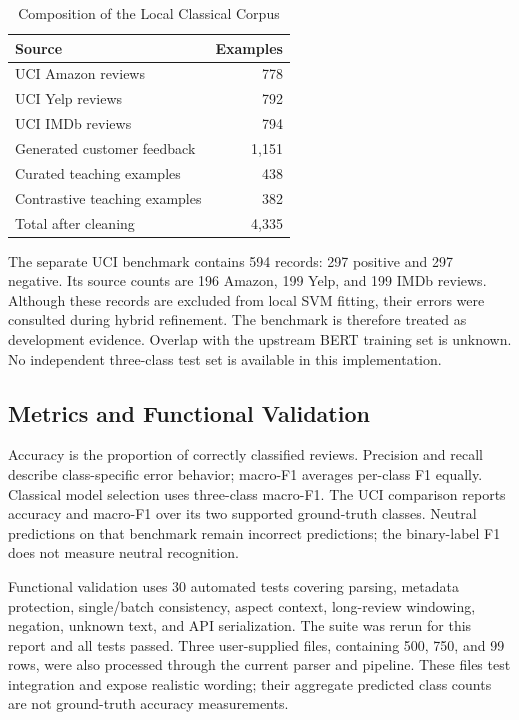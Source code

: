 \documentclass[conference,a4paper]{IEEEtran}
\begin{document}
\begin{table}[t]
\caption{Composition of the Local Classical Corpus}
\label{tab:data}
\centering\footnotesize
\begin{tabular}{lr}
\toprule
Source & Examples\\\midrule
UCI Amazon reviews & 778\\
UCI Yelp reviews & 792\\
UCI IMDb reviews & 794\\
Generated customer feedback & 1,151\\
Curated teaching examples & 438\\
Contrastive teaching examples & 382\\\midrule
Total after cleaning & 4,335\\\bottomrule
\end{tabular}
\end{table}

The separate UCI benchmark contains 594 records: 297 positive and 297 negative. Its source counts are 196 Amazon, 199 Yelp, and 199 IMDb reviews. Although these records are excluded from local SVM fitting, their errors were consulted during hybrid refinement. The benchmark is therefore treated as development evidence. Overlap with the upstream BERT training set is unknown. No independent three-class test set is available in this implementation.

\subsection{Metrics and Functional Validation}
Accuracy is the proportion of correctly classified reviews. Precision and recall describe class-specific error behavior; macro-F1 averages per-class F1 equally. Classical model selection uses three-class macro-F1. The UCI comparison reports accuracy and macro-F1 over its two supported ground-truth classes. Neutral predictions on that benchmark remain incorrect predictions; the binary-label F1 does not measure neutral recognition.

Functional validation uses 30 automated tests covering parsing, metadata protection, single/batch consistency, aspect context, long-review windowing, negation, unknown text, and API serialization. The suite was rerun for this report and all tests passed. Three user-supplied files, containing 500, 750, and 99 rows, were also processed through the current parser and pipeline. These files test integration and expose realistic wording; their aggregate predicted class counts are not ground-truth accuracy measurements.
\end{document}
